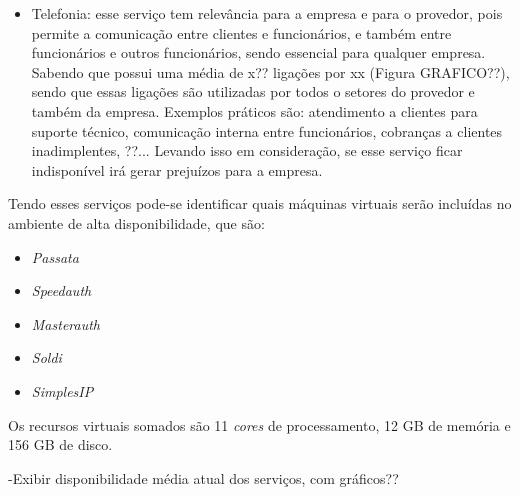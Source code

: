 \begin{itemize}
 \item Telefonia: esse serviço tem relevância para a empresa e para o provedor, pois permite a comunicação entre clientes e funcionários, 
 e também entre funcionários e outros funcionários, sendo essencial para qualquer empresa. Sabendo que possui uma média de x?? ligações por xx
 (Figura GRAFICO??), sendo que essas ligações são utilizadas por todos o setores do provedor e também da empresa. Exemplos práticos são: 
 atendimento a clientes para suporte técnico, comunicação interna entre funcionários, cobranças a clientes inadimplentes, ??... 
 Levando isso em consideração, se esse serviço ficar indisponível irá gerar prejuízos para a empresa.
\end{itemize}

Tendo esses serviços pode-se identificar quais máquinas virtuais serão incluídas no ambiente de alta disponibilidade, que são:
\begin{itemize}
 \item \textit{Passata}
 \item \textit{Speedauth}
 \item \textit{Masterauth}
 \item \textit{Soldi}
 \item \textit{SimplesIP}
\end{itemize}

Os recursos virtuais somados são 11 \textit{cores} de processamento, 12 GB de memória e 156 GB de disco.

-Exibir disponibilidade média atual dos serviços, com gráficos??



